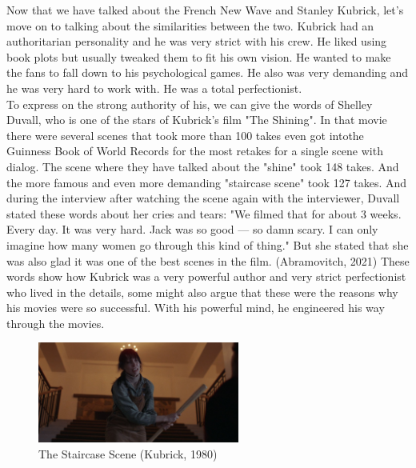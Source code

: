 \documentclass[12pt]{article}
\begin{document}
\FloatBarrier

\par
Now that we have talked about the French New Wave and Stanley Kubrick, let's move on to talking about the similarities between the two.
Kubrick had an authoritarian personality and he was very strict with his crew.
He liked using book plots but usually tweaked them to fit his own vision. He wanted to make the fans to fall down to his psychological games.
He also was very demanding and he was very hard to work with. He was a total perfectionist.
\\
To express on the strong authority of his, we can give the words of Shelley Duvall, who is one of the stars of Kubrick's film "The Shining".
In that movie there were several scenes that took more than 100 takes even got intothe Guinness Book of World Records
for the most retakes for a single scene with dialog. The scene where they have talked about the "shine" took 148 takes. And the more
famous and even more demanding "staircase scene" took 127 takes. And during the interview after watching the scene again with the interviewer,
Duvall stated these words about her cries and tears: "We filmed that for about 3 weeks. Every day. It was very hard. Jack was so good — so damn scary.
I can only imagine how many women go through this kind of thing." But she stated that she was also glad it was one of the best scenes in the film. (Abramovitch, 2021)
These words show how Kubrick was a very powerful author and very strict perfectionist who lived in the details,
some might also argue that these were the reasons why his movies were so successful. With his powerful mind,
he engineered his way through the movies.
\\

\begin{figure}[h]
        \begin{center}
                \includegraphics[width=250px]{staircase}
                \caption{The Staircase Scene (Kubrick, 1980)}
        \end{center}
\end{figure}

\FloatBarrier
\end{document}
